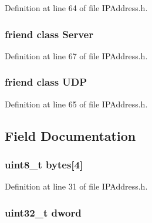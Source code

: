 Definition at line 64 of file I\+P\+Address.\+h.

\hypertarget{class_i_p_address_ac2055578ac48afabe5af487878450f68}{}
\subsubsection[{Server}]{\setlength{\rightskip}{0pt plus 5cm}friend class {\bf Server}\hspace{0.3cm}{\ttfamily [friend]}}\label{class_i_p_address_ac2055578ac48afabe5af487878450f68}


Definition at line 67 of file I\+P\+Address.\+h.

\hypertarget{class_i_p_address_a480cf93423716d22666c9c3f17177736}{}
\subsubsection[{U\+D\+P}]{\setlength{\rightskip}{0pt plus 5cm}friend class {\bf U\+D\+P}\hspace{0.3cm}{\ttfamily [friend]}}\label{class_i_p_address_a480cf93423716d22666c9c3f17177736}


Definition at line 65 of file I\+P\+Address.\+h.



\subsection{Field Documentation}
\hypertarget{class_i_p_address_aac9cc4cbc93c66d4b3e0e9e037695d5a}{}
\subsubsection[{bytes}]{\setlength{\rightskip}{0pt plus 5cm}uint8\+\_\+t bytes\mbox{[}4\mbox{]}}\label{class_i_p_address_aac9cc4cbc93c66d4b3e0e9e037695d5a}


Definition at line 31 of file I\+P\+Address.\+h.

\hypertarget{class_i_p_address_a07145ae3e31b274cc44076fe1681391f}{}
\subsubsection[{dword}]{\setlength{\rightskip}{0pt plus 5cm}uint32\+\_\+t dword}\label{class_i_p_address_a07145ae3e31b274cc44076fe1681391f}


